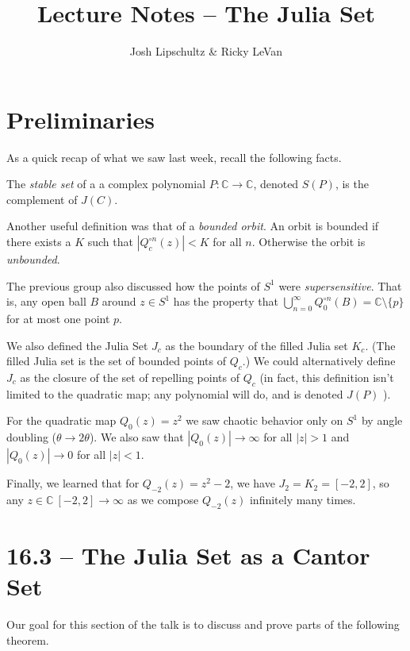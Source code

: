 \documentclass[symmetric]{tufte-handout}
\title{Lecture Notes -- The Julia Set}
\author{Josh Lipschultz \& Ricky LeVan}
\date{}  %
\begin{document}
\maketitle%

\section{Preliminaries}\label{sec:problem-1}

As a quick recap of what we saw last week, recall the following facts.

The \textsl{stable set} of a a complex polynomial $P: \mathbb{C} \rightarrow \mathbb{C}$, denoted $S(P)$, is the complement of $J(C)$.

Another useful definition was that of a \textsl{bounded orbit}. An orbit is bounded if there exists a $K$ such that $|Q_c^{\circ n}(z)| < K$ for all $n$. Otherwise the orbit is \textsl{unbounded}.

The previous group also discussed how the points of $S^1$ were \textsl{supersensitive}. That is, any open ball $B$ around $z \in S^1$ has the property that $\bigcup_{n=0}^\infty Q_0^{\circ n} (B) = \mathbb{C} \setminus \{p\}$ for at most one point $p$.

We also defined the Julia Set $J_c$ as the boundary of the filled Julia set $K_c$. (The filled Julia set is the set of bounded points of $Q_c$.) We could alternatively define $J_c$ as the closure of the set of repelling points of $Q_c$ (in fact, this definition isn't limited to the quadratic map; any polynomial will do, and is denoted $J(P)$ ).

For the quadratic map $Q_0(z) = z^2$ we saw chaotic behavior only on $S^1$ by angle doubling ($\theta \rightarrow 2\theta$). We also saw that $|Q_0(z)| \rightarrow \infty$ for all $|z| > 1$ and $|Q_0(z)| \rightarrow 0$ for all $|z| < 1$.

Finally, we learned that for $Q_{-2}(z) = z^2 - 2$, we have $J_2 = K_2 = [-2, 2]$, so any $z \in \mathbb{C} \ [-2,2] \rightarrow \infty$ as we compose $Q_{-2}(z)$ infinitely many times. 


\section{16.3 -- The Julia Set as a Cantor Set}\label{sec:problem-1}

Our goal for this section of the talk is to discuss and prove parts of
the following theorem.
\end{document}
